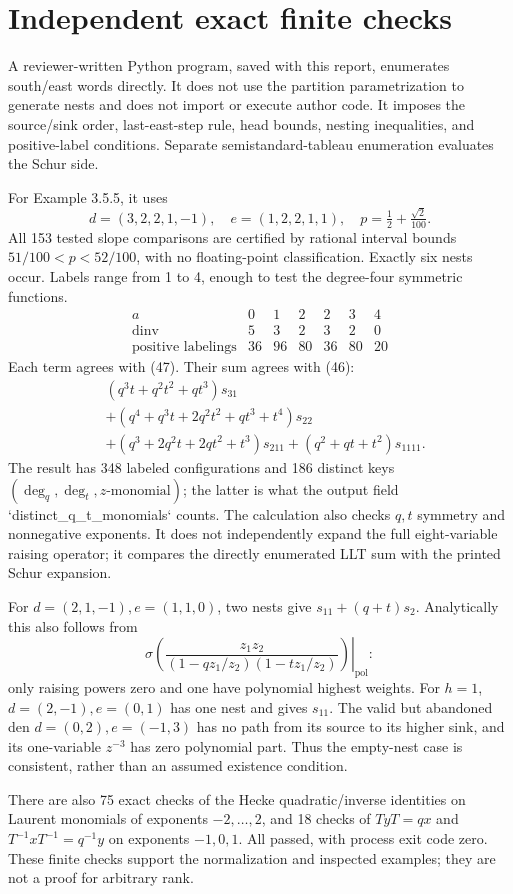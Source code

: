 \documentclass[10pt]{article}
\begin{document}
\section*{Independent exact finite checks}
A reviewer-written Python program, saved with this report, enumerates south/east words directly. It does not use the partition parametrization to generate nests and does not import or execute author code. It imposes the source/sink order, last-east-step rule, head bounds, nesting inequalities, and positive-label conditions. Separate semistandard-tableau enumeration evaluates the Schur side.\par
For Example 3.5.5, it uses \[d=(3,2,2,1,-1),\quad e=(1,2,2,1,1),\quad
 p=\tfrac12+\tfrac{\sqrt2}{100}.\] All 153 tested slope comparisons are certified by rational interval bounds \(51/100<p<52/100\), with no floating-point classification. Exactly six nests occur. Labels range from 1 to 4, enough to test the degree-four symmetric functions. \[\begin{array}{c|rrrrrr}
a&0&1&2&2&3&4\\
\operatorname{dinv}&5&3&2&3&2&0\\
\text{positive labelings}&36&96&80&36&80&20
\end{array}\] Each term agrees with (47). Their sum agrees with (46): \[\begin{aligned}
 &(q^3t+q^2t^2+qt^3)s_{31}\\
 &+(q^4+q^3t+2q^2t^2+qt^3+t^4)s_{22}\\
 &+(q^3+2q^2t+2qt^2+t^3)s_{211}
 +(q^2+qt+t^2)s_{1111}.\end{aligned}\] The result has 348 labeled configurations and 186 distinct keys \((\deg_q,\deg_t,z\text{-monomial})\); the latter is what the output field `distinct\_q\_t\_monomials` counts. The calculation also checks \(q,t\) symmetry and nonnegative exponents. It does not independently expand the full eight-variable raising operator; it compares the directly enumerated LLT sum with the printed Schur expansion.\par
For \(d=(2,1,-1),e=(1,1,0)\), two nests give \(s_{11}+(q+t)s_2\). Analytically this also follows from \[\left.\sigma\left(
 \frac{z_1z_2}{(1-qz_1/z_2)(1-tz_1/z_2)}
 \right)\right|_{\operatorname{pol}}:\] only raising powers zero and one have polynomial highest weights. For \(h=1\), \(d=(2,-1),e=(0,1)\) has one nest and gives \(s_{11}\). The valid but abandoned den \(d=(0,2),e=(-1,3)\) has no path from its source to its higher sink, and its one-variable \(z^{-3}\) has zero polynomial part. Thus the empty-nest case is consistent, rather than an assumed existence condition.\par
There are also 75 exact checks of the Hecke quadratic/inverse identities on Laurent monomials of exponents \(-2,\ldots,2\), and 18 checks of \(T y T=q x\) and \(T^{-1}xT^{-1}=q^{-1}y\) on exponents \(-1,0,1\). All passed, with process exit code zero. These finite checks support the normalization and inspected examples; they are not a proof for arbitrary rank.\par
\end{document}
